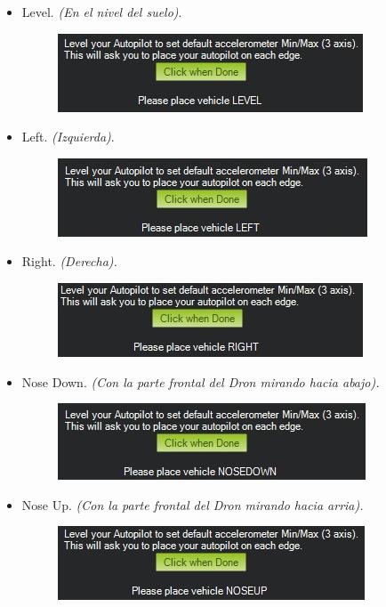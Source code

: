 \begin{itemize}
	\item Level. \textit{(En el nivel del suelo)}.
	\begin{figure}[H]
		\centering
		\includegraphics[width=0.6\linewidth]{imagenes/conf1}
		\caption{}
		\label{fig:conf1}
	\end{figure}
	
	\item Left. \textit{(Izquierda)}.
	\begin{figure}[H]
		\centering
		\includegraphics[width=0.6\linewidth]{imagenes/conf2}
		\caption{}
		\label{fig:conf1}
	\end{figure}
	
	\item Right. \textit{(Derecha).}
	\begin{figure}[H]
		\centering
		\includegraphics[width=0.6\linewidth]{imagenes/conf3}
		\caption{}
		\label{fig:conf1}
	\end{figure}
	
	\item Nose Down. \textit{(Con la parte frontal del Dron mirando hacia abajo).}
	\begin{figure}[H]
		\centering
		\includegraphics[width=0.6\linewidth]{imagenes/conf4}
		\caption{}
		\label{fig:conf1}
	\end{figure}
	
	\item Nose Up.\textit{ (Con la parte frontal del Dron mirando hacia arria).}
	\begin{figure}[H]
		\centering
		\includegraphics[width=0.6\linewidth]{imagenes/conf5}
		\caption{}
		\label{fig:conf1}
	\end{figure}
	

\end{itemize}
